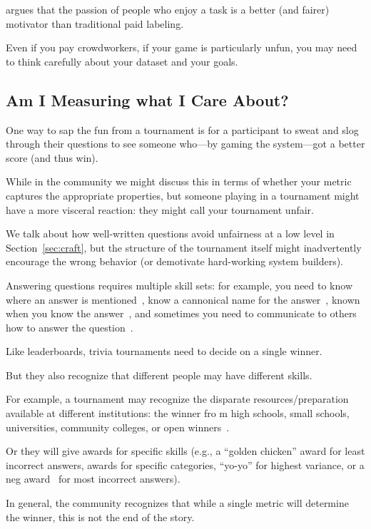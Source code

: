  argues that the passion of people who enjoy a task is a better (and fairer) motivator than traditional paid labeling.

Even if you pay crowdworkers, if your game is particularly unfun, you may need to think carefully about your dataset and your goals.

\subsection{Am I Measuring what I Care About?}

One way to sap the fun from a tournament is for a participant to sweat and slog through their questions to see someone who---by gaming the system---got a better score (and thus win).

While in the  community we might discuss this in terms of whether your metric captures the appropriate properties, but someone playing in a tournament might have a more visceral reaction: they might call your tournament unfair.

We talk about how well-written questions avoid unfairness at a low level in Section~\ref{sec:craft}, but the structure of the tournament itself might inadvertently encourage the wrong behavior (or demotivate hard-working system builders).

Answering questions requires multiple skill sets: for example, you need to know where an answer is mentioned~\citep{hermann-15}, know a cannonical name for the answer~\citep{yih-15}, known when you know the answer~\citep{rajpurkar-18}, and sometimes you need to communicate to others how to answer the question~\citep{fever-18}.

Like  leaderboards, trivia tournaments need to decide on a single winner.

But they also recognize that different people may have different skills.

For example, a tournament may recognize the disparate resources/preparation available at different institutions: the winner fro m high schools, small schools, universities, community colleges, or open winners~\citep{naqt-eligibility}.

Or they will give awards for specific skills (e.g., a ``golden chicken'' award for least incorrect answers, awards for specific categories, ``yo-yo'' for highest variance, or a neg award~\citep{neg-award} for most incorrect answers).

In general, the community recognizes that while a single metric will determine the winner, this is not the end of the story.

